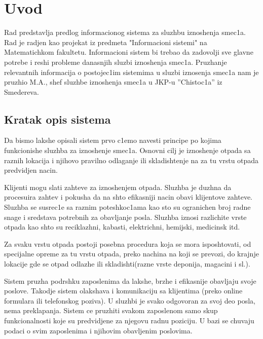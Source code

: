 \documentclass[10 pt]{article}
\begin{document}
	\newpage
	\renewcommand*\contentsname{Sadrzhaj:}
	\tableofcontents
	
	\newpage

		
	\section{Uvod}
	
	Rad predstavlja predlog informacionog sistema za sluzhbu iznoshenja smec1a. Rad je radjen kao projekat iz predmeta "Informacioni sistemi" na Matematichkom fakultetu. Informacioni sistem bi trebao da zadovolji sve glavne potrebe i reshi probleme danasnjih sluzbi iznoshenja smec1a. Pruzhanje relevantnih informacija o postojec1im sistemima u sluzbi iznosenja smec1a nam je pruzhio M.A., shef sluzhbe iznoshenja smec1a u  JKP-u ''Chistoc1a'' iz Smedereva.
	
	\subsection{Kratak opis sistema}
	
	Da bismo lakshe opisali sistem prvo c1emo navesti principe po kojima funkcionishe sluzhba za iznoshenje smec1a. Osnovni cilj je iznoshenje otpada sa raznih lokacija i njihovo pravilno odlaganje ili skladishtenje na za tu vrstu otpada predvidjen nacin.
	
	Klijenti mogu slati zahteve za iznoshenjem otpada. Sluzhba je duzhna da procesuira zahtev i pokusha da na shto efikasniji nacin obavi klijentove zahteve. Sluzhba se susrec1e sa raznim poteshkoc1ama kao sto su ogranichen broj radne snage i sredstava potrebnih za obavljanje posla. Sluzhba iznosi razlichite vrste otpada kao shto su reciklazhni, kabasti, elektrichni, hemijski, medicinsk itd.
	
	Za svaku vrstu otpada postoji posebna procedura koja se mora isposhtovati, od specijalne opreme za tu vrstu otpada, preko nachina na koji se prevozi, do krajnje lokacije gde se otpad odlazhe ili skladishti(razne vrste deponija, magacini i sl.).
	
	Sistem pruzha podrshku zaposlenima da lakshe, brzhe i efikasnije obavljaju svoje poslove. Takodje sistem olakshava i komunikaciju sa klijentima (preko online formulara ili telefonskog poziva). U sluzhbi je svako odgovoran za svoj deo posla, nema preklapanja. Sistem ce pruzhiti svakom zaposlenom samo skup funkcionalnosti koje su predvidjene za njegovu radnu poziciju. U bazi se chuvaju podaci o svim zaposlenima i njihovim obavljenim poslovima.
	
\end{document}
